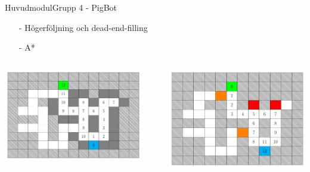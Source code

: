 \begin{frame}{Huvudmodul}{Grupp 4 - PigBot}
  \begin{itemize}
    \item[-] Högerföljning och dead-end-filling
    \item[-] A*
  \end{itemize}
  \pause
  \begin{columns}
    \begin{column}{0.45\textwidth}
      \centering
      \includegraphics[width=\textwidth]{images/map.pdf}
    \end{column}
    \begin{column}{0.1\textwidth}
      \centering
      $\rightarrow$
    \end{column}
    \begin{column}{0.45\textwidth}
      \centering
      \includegraphics[width=\textwidth]{images/path.pdf}
    \end{column}
  \end{columns}
\end{frame}


